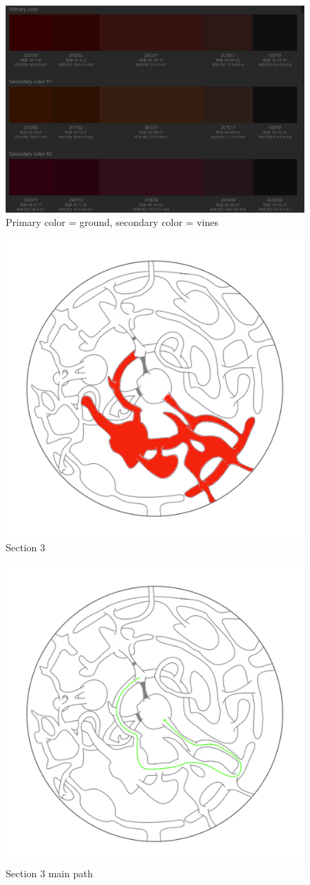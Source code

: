 \begin{figure}[H]
	\centering
	\includegraphics[width=0.8\linewidth]{images/visual_ref/15_giant_chasm/pallette/pallette_section_03.png}
	\caption*{Primary color = ground, secondary color = vines}
\end{figure}

\begin{figure}[H]
	\centering
	\includegraphics[width=0.7\linewidth]{images/map/2D_map_section_03.png}
	\caption*{Section 3}
\end{figure}

\begin{figure}[H]
	\centering
	\includegraphics[width=0.7\linewidth]{images/map/map_principle_path_section_03.png}
	\caption*{Section 3 main path}
\end{figure}


